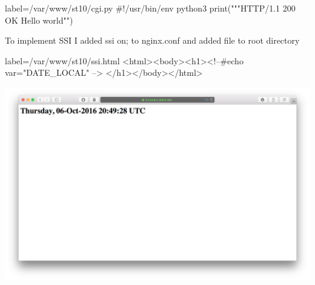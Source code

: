 \documentclass[a4paper,11pt]{article}
\begin{document}
\begin{pythoncode*}{label=/var/www/st10/cgi.py}
#!/usr/bin/env python3
print("""HTTP/1.1 200 OK
Hello world"")
\end{pythoncode*}
To implement SSI I added ssi on; to nginx.conf and added file to root directory

\begin{htmlcode*}{label=/var/www/st10/ssi.html}
<html><body><h1><!--#echo var="DATE_LOCAL" --> </h1></body></html>
\end{htmlcode*}

\begin{center}
\includegraphics[width=17cm]{ssi}
\end{center}
\end{document}
